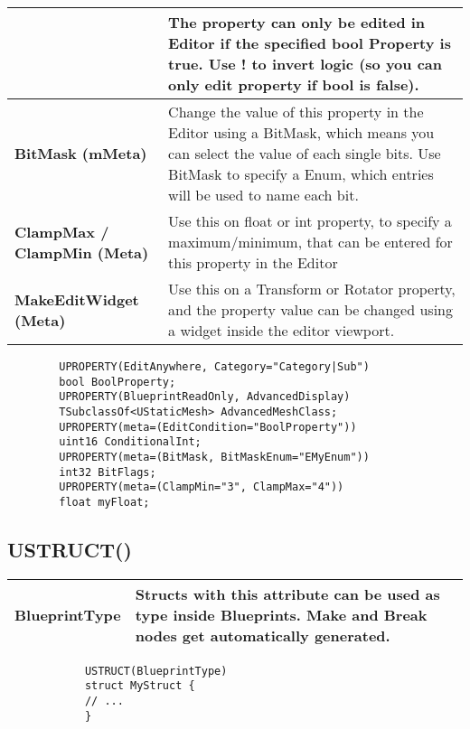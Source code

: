 \documentclass[10pt,a4paper]{article}
\begin{document}
\begin{multicols*}{2}
\begin{tabularx}{\columnwidth}{|p{3.5cm}|X|}
		&  The property can only be edited in Editor if the specified bool Property is true. Use ! to invert logic (so you can only edit property if bool is false). \\
		\hline \textbf{BitMask (mMeta)}
		& Change the value of this property in the Editor using a BitMask, which means you can select the value of each single bits. Use BitMask to specify a Enum, which entries will be used to name each bit. \\
		\hline \textbf{ClampMax / ClampMin (Meta)}
		& Use this on float or int property, to specify a maximum/minimum, that can be entered for this property in the Editor \\
		\hline \textbf {MakeEditWidget (Meta)}
		& Use this on a Transform or Rotator property, and the property value can be changed using a widget inside the editor viewport. \\
		\hline
	\end{tabularx}

	\begin{minipage}{\columnwidth}
	\begin{verbatim}
		UPROPERTY(EditAnywhere, Category="Category|Sub")
		bool BoolProperty;
		UPROPERTY(BlueprintReadOnly, AdvancedDisplay)
		TSubclassOf<UStaticMesh> AdvancedMeshClass;
		UPROPERTY(meta=(EditCondition="BoolProperty"))
		uint16 ConditionalInt;
		UPROPERTY(meta=(BitMask, BitMaskEnum="EMyEnum"))
		int32 BitFlags;
		UPROPERTY(meta=(ClampMin="3", ClampMax="4"))
		float myFloat;
	\end{verbatim}
\end{minipage}

	
	\subsection{USTRUCT()}
	
	\begin{tabularx}{\columnwidth}{|p{3.5cm}|X|}
		\hline \textbf{BlueprintType}
		& Structs with this attribute can be used as type inside Blueprints. Make and Break nodes get automatically generated.\\
		\hline
	\end{tabularx}
	
	\begin{minipage}{\columnwidth}
		\begin{verbatim}
			USTRUCT(BlueprintType)
			struct MyStruct {
			// ...
			}	
		\end{verbatim}
	\end{minipage}
	

\end{multicols*}
\end{document}
